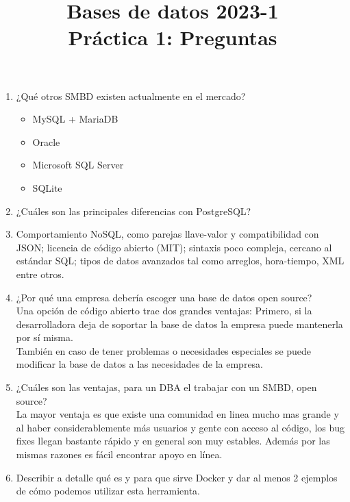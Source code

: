 \documentclass[12pt,a4paper]{article}
\title{Bases de datos 2023-1\\
Práctica 1: Preguntas}
\begin{document}
\maketitle

\begin{enumerate}
    \item ¿Qué otros SMBD existen actualmente en el mercado?\\
        \begin{itemize}
            \item MySQL + MariaDB
            \item Oracle
            \item Microsoft SQL Server
            \item SQLite
        \end{itemize}

    \item ¿Cuáles son las principales diferencias con PostgreSQL?\\
        \item Comportamiento NoSQL, como parejas llave-valor y compatibilidad con
        JSON; licencia de código abierto (MIT); sintaxis poco compleja, cercano al
        estándar SQL; tipos de datos avanzados tal como arreglos, hora-tiempo, XML
        entre otros.

    \item ¿Por qué una empresa debería escoger una base de datos open source?\\
        Una opción de código abierto trae dos grandes ventajas:
        Primero, si la desarrolladora deja de soportar la base de datos la empresa
        puede mantenerla por sí misma.\\
        También en caso de tener problemas o necesidades especiales se puede
        modificar la base de datos a las necesidades de la empresa.\\

    \item ¿Cuáles son las ventajas, para un DBA el trabajar con un SMBD, open source?\\

        La mayor ventaja es que existe una comunidad en linea mucho mas grande y al haber
        considerablemente más usuarios y gente con acceso al código, los bug fixes llegan bastante rápido
        y en general son muy estables. Además por las mismas razones es fácil encontrar apoyo en línea.

    \item Describir a detalle qué es y para que sirve Docker y dar al menos 2 ejemplos\\
        de cómo podemos utilizar esta herramienta.


\end{enumerate}
\end{document}
